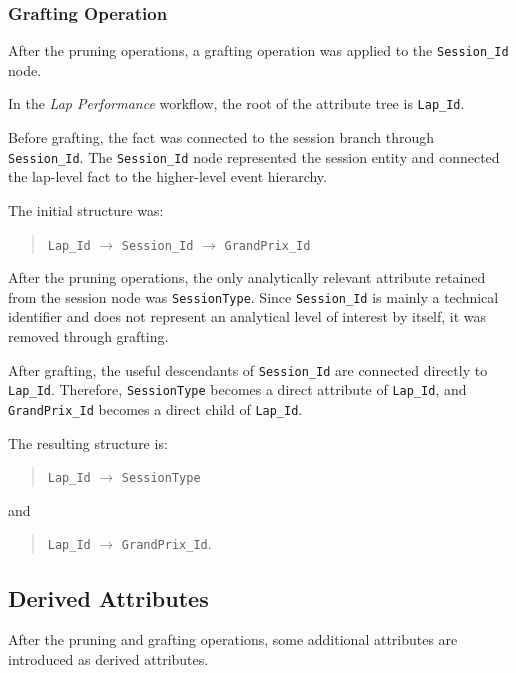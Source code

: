 \documentclass[a4paper,11pt]{article}
\begin{document}
	
	\subsubsection{Grafting Operation}
	
	After the pruning operations, a grafting operation was applied to the
	\texttt{Session\_Id} node.
	
	In the \textit{Lap Performance} workflow, the root of the attribute tree is
	\texttt{Lap\_Id}.
	
	Before grafting, the fact was connected to the session branch through
	\texttt{Session\_Id}. The \texttt{Session\_Id} node represented the session entity and
	connected the lap-level fact to the higher-level event hierarchy.
	
	The initial structure was:
	
	\begin{quote}
		\texttt{Lap\_Id} $\rightarrow$ \texttt{Session\_Id} $\rightarrow$ \texttt{GrandPrix\_Id}
	\end{quote}
	
	After the pruning operations, the only analytically relevant attribute retained from the
	session node was \texttt{SessionType}. Since \texttt{Session\_Id} is mainly a technical
	identifier and does not represent an analytical level of interest by itself, it was removed
	through grafting.
	
	After grafting, the useful descendants of \texttt{Session\_Id} are connected directly to
	\texttt{Lap\_Id}. Therefore, \texttt{SessionType} becomes a direct attribute of
	\texttt{Lap\_Id}, and \texttt{GrandPrix\_Id} becomes a direct child of \texttt{Lap\_Id}.
	
	The resulting structure is:
	
	\begin{quote}
		\texttt{Lap\_Id} $\rightarrow$ \texttt{SessionType}
	\end{quote}
	
	and
	
	\begin{quote}
		\texttt{Lap\_Id} $\rightarrow$ \texttt{GrandPrix\_Id}.
	\end{quote}
	
	
	\subsection{Derived Attributes}
	
	After the pruning and grafting operations, some additional attributes are introduced as
	derived attributes.
	
\end{document}
